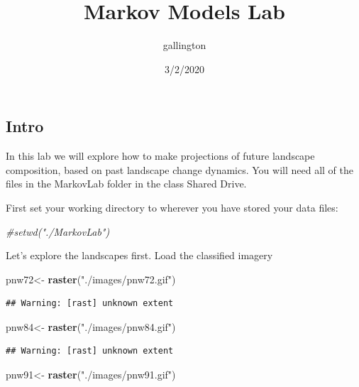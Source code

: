 \documentclass[
]{article}
\title{Markov Models Lab}
\author{gallington}
\date{3/2/2020}
\newenvironment{Shaded}{\begin{snugshade}}{\end{snugshade}}
\newcommand{\CommentTok}[1]{\textcolor[rgb]{0.56,0.35,0.01}{\textit{#1}}}
\newcommand{\FunctionTok}[1]{\textcolor[rgb]{0.13,0.29,0.53}{\textbf{#1}}}
\newcommand{\NormalTok}[1]{#1}
\newcommand{\OtherTok}[1]{\textcolor[rgb]{0.56,0.35,0.01}{#1}}
\newcommand{\StringTok}[1]{\textcolor[rgb]{0.31,0.60,0.02}{#1}}
\begin{document}
\maketitle

\subsection{Intro}\label{intro}

In this lab we will explore how to make projections of future landscape
composition, based on past landscape change dynamics. You will need all
of the files in the MarkovLab folder in the class Shared Drive.

First set your working directory to wherever you have stored your data
files:

\begin{Shaded}
\begin{Highlighting}[]
\CommentTok{\#setwd("./MarkovLab")  }
\end{Highlighting}
\end{Shaded}

Let's explore the landscapes first. Load the classified imagery

\begin{Shaded}
\begin{Highlighting}[]
\NormalTok{pnw72}\OtherTok{\textless{}{-}} \FunctionTok{raster}\NormalTok{(}\StringTok{"./images/pnw72.gif"}\NormalTok{)}
\end{Highlighting}
\end{Shaded}

\begin{verbatim}
## Warning: [rast] unknown extent
\end{verbatim}

\begin{Shaded}
\begin{Highlighting}[]
\NormalTok{pnw84}\OtherTok{\textless{}{-}} \FunctionTok{raster}\NormalTok{(}\StringTok{"./images/pnw84.gif"}\NormalTok{)}
\end{Highlighting}
\end{Shaded}

\begin{verbatim}
## Warning: [rast] unknown extent
\end{verbatim}

\begin{Shaded}
\begin{Highlighting}[]
\NormalTok{pnw91}\OtherTok{\textless{}{-}} \FunctionTok{raster}\NormalTok{(}\StringTok{"./images/pnw91.gif"}\NormalTok{)}
\end{Highlighting}
\end{Shaded}
\end{document}
